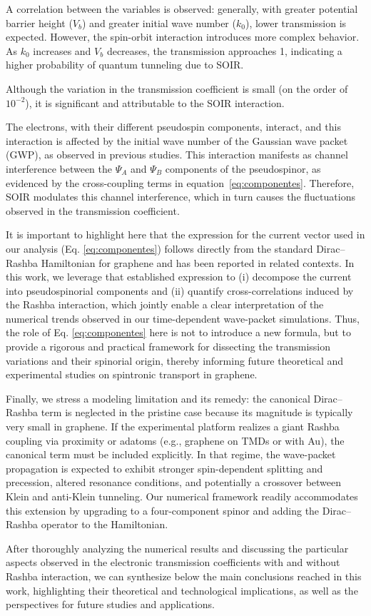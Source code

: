 A correlation between the variables is observed: generally, with greater potential barrier height ($V_b$) and greater initial wave number ($k_0$), lower transmission is expected.
However, the spin-orbit interaction introduces more complex behavior.
As $k_0$ increases and $V_b$ decreases, the transmission approaches 1, indicating a higher probability of quantum tunneling due to SOIR\@.

Although the variation in the transmission coefficient is small (on the order of $10^{-2}$), it is significant and attributable to the SOIR interaction.

The electrons, with their different pseudospin components, interact, and this interaction is affected by the initial wave number of the Gaussian wave packet (GWP), as observed in previous studies\cite{Serna2019}.
This interaction manifests as channel interference between the $\Psi_A$ and $\Psi_B$ components of the pseudospinor, as evidenced by the cross-coupling terms in equation~\ref{eq:componentes}.
Therefore, SOIR modulates this channel interference, which in turn causes the fluctuations observed in the transmission coefficient.

It is important to highlight here that the expression for the current vector used in our analysis (Eq. \ref{eq:componentes}) follows directly from the standard Dirac–Rashba Hamiltonian for graphene and has been reported in related contexts\cite{AvishaiPhysRevB2021}.
In this work, we leverage that established expression to (i) decompose the current into pseudospinorial components and (ii) quantify cross-correlations induced by the Rashba interaction, which jointly enable a clear interpretation of the numerical trends observed in our time-dependent wave-packet simulations.
Thus, the role of Eq. \ref{eq:componentes} here is not to introduce a new formula, but to provide a rigorous and practical framework for dissecting the transmission variations and their spinorial origin\cite{Serna2019}, thereby informing future theoretical and experimental studies on spintronic transport in graphene.

Finally, we stress a modeling limitation and its remedy: the canonical Dirac–Rashba term is neglected in the pristine case because its magnitude is typically very small in graphene.
If the experimental platform realizes a giant Rashba coupling via proximity or adatoms (e.g., graphene on TMDs or with Au), the canonical term must be included explicitly.
In that regime, the wave-packet propagation is expected to exhibit stronger spin-dependent splitting and precession, altered resonance conditions, and potentially a crossover between Klein and anti-Klein tunneling\cite{DellAnnaJPhysCondMatt2018, AvsarNatCommun2014, WangPhysRevX2016}.
Our numerical framework readily accommodates this extension by upgrading to a four-component spinor and adding the Dirac–Rashba operator to the Hamiltonian.

After thoroughly analyzing the numerical results and discussing the particular aspects observed in the electronic transmission coefficients with and without Rashba interaction, we can synthesize below the main conclusions reached in this work, highlighting their theoretical and technological implications, as well as the perspectives for future studies and applications.
